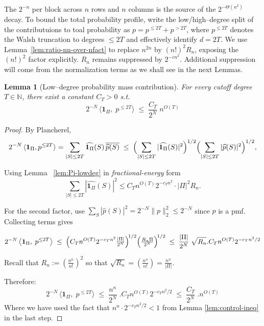 \documentclass[a4paper,onecolumn,11pt,unpublished]{quantumarticle}
\newtheorem{lemma}[theorem]{Lemma}
\theoremstyle{remark}
\begin{document}
The \(2^{-n}\) per block across \(n\) rows and \(n\) columns is the source of the \(2^{-\Theta(n^2)}\) decay. To bound the total probability profile, write the low/high–degree split of the contributuions to toal probability as \(p=p^{\le 2T}+p^{>2T}\), where \(p^{\le2T}\) denotes the Walsh truncation to degrees \(\le 2T\) and effectively identify $d=2T$. We use Lemma~\ref{lem:ratio-nn-over-nfact} to replace $n^{2n}$
by $(n!)^2 R_n$, exposing the $(n!)^2$ factor explicitly. $R_n$ remains suppressed by $2^{-c n^2}$. Additional suppression will come from the normalization terms as we shall see in the next Lemmas.

\begin{lemma}[Low–degree probability mass contribution]
\label{lem:lowdeg-corr-correct}
For every cutoff degree  $T\in\mathbb{N}$, there exist a constant $C_T>0$ s.t.
\[
  2^{-N}\,\bigl\langle \mathbf{1}_\Pi,\; p^{\le2T}\bigr\rangle
  \;\le\;
  \frac{C_T}{2^{N}}\; n^{O(T)} 
\]

\end{lemma}

\begin{proof}
By Plancherel,
\[
  2^{-N}\,\langle \mathbf{1}_\Pi, p^{\le 2T}\rangle
  = \sum_{|S|\le 2T}\widehat{\mathbf{1}_\Pi}(S)\,\overline{\widehat p(S)}
  \;\le\;
  \Bigl(\sum_{|S|\le2T}|\widehat{\mathbf{1}_\Pi}(S)|^2\Bigr)^{1/2}
  \Bigl(\sum_{|S|\le2T}|\widehat p(S)|^2\Bigr)^{1/2},
\]

 Using Lemma ~\ref{lem:Pi-lowdeg} in \emph{fractional-energy} form
\[
  \sum_{|S|\le2T}|\widehat{\mathbf{1}_\Pi}(S)|^2
  \le C_T n^{O(T)} 2^{-c_T n^2}\cdot|\Pi|^2R_n.
\]


For the second factor, use
$\sum_S|\widehat p(S)|^2 = 2^{-N}\|p\|_2^2 \le 2^{-N}$ since $p$ is a pmf.
Collecting terms gives


\[
  2^{-N}\,\bigl\langle \mathbf{1}_\Pi,\; p^{\le2T}\bigr\rangle
  \;\le\;
  \Bigl(C_T n^{O(T)} 2^{-c_T n^2}\tfrac{|\Pi|}{2^{N}}\Bigr)^{\!1/2}
  \Bigl(\tfrac{R_n\Pi}{2^{N}}\Bigr)^{\!1/2}
  \;\le\;
  \frac{{|\Pi|}}{2^{N}}\;  \sqrt{R_n}.C_T n^{O(T)} 2^{-c_T n^2/2}
\]


Recall that $ R_n:=\left(\frac{n^n}{n!}\right)^{\!2}$ so that $\sqrt{R_n} =\left(\frac{n^n}{n!}\right) = \frac{n^n}{|\Pi|}. $

Therefore:
\[
  2^{-N}\,\bigl\langle \mathbf{1}_\Pi,\; p^{\le2T}\bigr\rangle
  \;\le\;
  \frac{{n^n}}{2^{N}}\; .C_T n^{O(T)} 2^{-c_T n^2/2}
    \;\le\;
     \frac{{C_T}}{2^{N}}\; . n^{O(T)} 
\]
Where we have used the fact that \(n^n\cdot2^{-c_T n^2/2} <1\) from Lemma \ref{lem:control-ineq} in the last step.
\end{proof}
\end{document}
